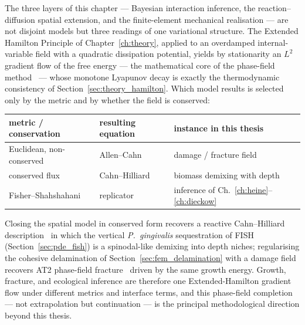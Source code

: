 The three layers of this chapter --- Bayesian interaction inference, the
reaction--diffusion spatial extension, and the finite-element mechanical realisation
--- are not disjoint models but three readings of one variational structure. The
Extended Hamilton Principle of Chapter~\ref{ch:theory}, applied to an overdamped
internal-variable field with a quadratic dissipation potential, yields by stationarity
an $L^2$ gradient flow of the free energy --- the mathematical core of the phase-field
method~\cite{AllenCahn1979} --- whose monotone Lyapunov decay is exactly the
thermodynamic consistency of Section~\ref{sec:theory_hamilton}. Which model results is
selected only by the metric and by whether the field is conserved:
\begin{center}\small
\begin{tabular}{@{}lll@{}}
\toprule
metric / conservation & resulting equation & instance in this thesis\\
\midrule
Euclidean, non-conserved & Allen--Cahn          & damage / fracture field\\
conserved flux           & Cahn--Hilliard       & biomass demixing with depth\\
Fisher--Shahshahani      & replicator           & inference of Ch.~\ref{ch:heine}--\ref{ch:dieckow}\\
\bottomrule
\end{tabular}
\end{center}
Closing the spatial model in conserved form recovers a reactive Cahn--Hilliard
description~\cite{CahnHilliard1958} in which the vertical \textit{P.~gingivalis}
sequestration of FISH (Section~\ref{sec:pde_fish}) is a spinodal-like demixing into
depth niches; regularising the cohesive delamination of
Section~\ref{sec:fem_delamination} with a damage field recovers AT2 phase-field
fracture~\cite{Bourdin2008Variational,Miehe2010PhaseField} driven by the same growth
energy. Growth, fracture, and ecological inference are therefore one Extended-Hamilton
gradient flow under different metrics and interface terms, and this phase-field
completion --- not extrapolation but continuation --- is the principal methodological
direction beyond this thesis.
